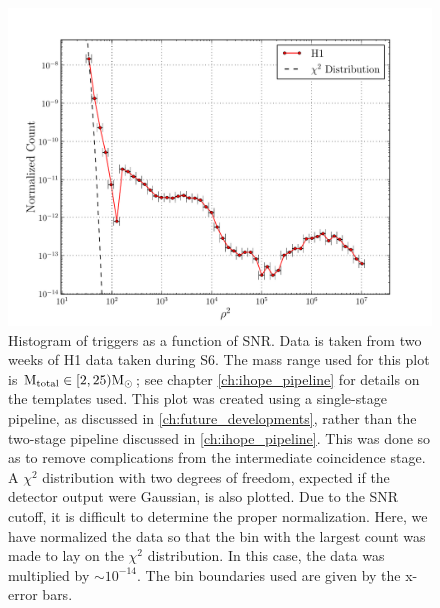 \begin{figure}
\center
\includegraphics[width=6in]{figures/H1-snr_hist_cat1_veto.pdf}
\caption{Histogram of triggers as a function of SNR. Data is taken from two weeks of H1 data taken during S6. The mass range used for this plot is $\mathrm{M_{total}} \in [2,25)\mathrm{M_\odot}$; see chapter \ref{ch:ihope_pipeline} for details on the templates used. This plot was created using a single-stage pipeline, as discussed in \ref{ch:future_developments}, rather than the two-stage pipeline discussed in \ref{ch:ihope_pipeline}. This was done so as to remove complications from the intermediate coincidence stage. A $\chi^2$ distribution with two degrees of freedom, expected if the detector output were Gaussian, is also plotted. Due to the SNR cutoff, it is difficult to determine the proper normalization. Here, we have normalized the data so that the bin with the largest count was made to lay on the $\chi^2$ distribution. In this case, the data was multiplied by $\sim10^{-14}$. The bin boundaries used are given by the x-error bars.}
\label{fig:snr_hist}
\end{figure}

